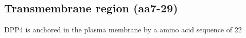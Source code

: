 \subsection{Transmembrane region (aa7-29)}

DPP4 is anchored in the plasma membrane by a amino acid sequence of 22